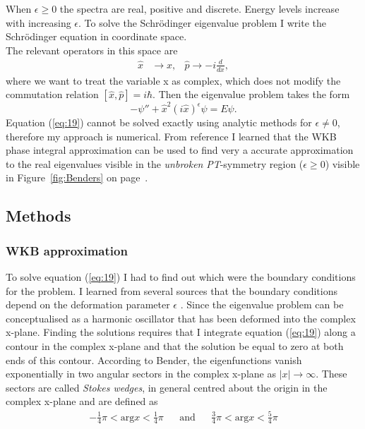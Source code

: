 \documentclass[10pt, a4paper, singlespacing, headsepline]{article}
\newcommand\PT{\textit{PT}}
\begin{document}
When $\epsilon \geq 0$ the spectra are real, positive and discrete. Energy levels increase with increasing $\epsilon$.
To solve the Schrödinger eigenvalue problem I write the Schrödinger equation in coordinate space.\\ The relevant operators in this space are
\begin{align}
\hat{x}& \rightarrow x,  &\hat{p}\rightarrow -i \frac{d}{dx},
\end{align}
where we want to treat the variable x as complex, which does not modify the commutation relation $[\hat{x}, \hat{p}] = i\hbar$. Then the eigenvalue problem takes the form
\begin{equation}\label{eq:19}
-\psi'' + \hat{x}^2 (i \hat{x})^{\epsilon} \psi = E \psi.
\end{equation}
Equation (\ref{eq:19}) cannot be solved exactly using analytic methods for $\epsilon \neq 0$, therefore my approach is numerical. From reference \cite{Bender} I learned that the WKB phase integral approximation can be used to find very a accurate approximation to the real eigenvalues visible in the \textit{unbroken} \PT-symmetry region ($\epsilon \geq 0$) visible in Figure~\ref{fig:Benders} on page~\pageref{fig:Benders}. 

\subsection{Methods}

\subsubsection{WKB approximation}
To solve equation (\ref{eq:19}) I had to find out which were the boundary conditions for the problem. I learned from several sources that the boundary conditions depend on the deformation parameter $\epsilon$ \cite{BenderPT}\cite{Bender}\cite{Bender2017}. Since the eigenvalue problem can be conceptualised as a harmonic oscillator that has been deformed into the complex x-plane. Finding the solutions requires that I integrate equation (\ref{eq:19}) along a contour in the complex x-plane and that the solution be equal to zero at both ends of this contour\cite{BenderPT}. According to Bender, the eigenfunctions vanish exponentially in two angular sectors in the complex x-plane as $|x| \rightarrow \infty$. These sectors are called \textit{Stokes wedges}\cite{BenderPT}\cite{Bender}, in general centred about the origin in the complex x-plane and are defined as 
\begin{align}
&-\frac{1}{4} \pi  < \mathrm{arg}x < \frac{1}{4}\pi& &\mathrm{and}& &\frac{3}{4} \pi  < \mathrm{arg}x < \frac{5}{4}\pi& 
\end{align}
\end{document}
